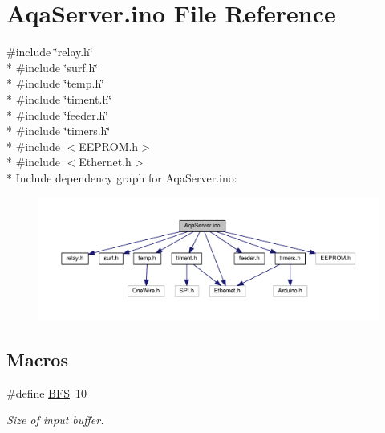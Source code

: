 \hypertarget{_aqa_server_8ino}{\section{Aqa\+Server.\+ino File Reference}
\label{_aqa_server_8ino}
}
{\ttfamily \#include \char`\"{}relay.\+h\char`\"{}}\\*
{\ttfamily \#include \char`\"{}surf.\+h\char`\"{}}\\*
{\ttfamily \#include \char`\"{}temp.\+h\char`\"{}}\\*
{\ttfamily \#include \char`\"{}timent.\+h\char`\"{}}\\*
{\ttfamily \#include \char`\"{}feeder.\+h\char`\"{}}\\*
{\ttfamily \#include \char`\"{}timers.\+h\char`\"{}}\\*
{\ttfamily \#include $<$E\+E\+P\+R\+O\+M.\+h$>$}\\*
{\ttfamily \#include $<$Ethernet.\+h$>$}\\*
Include dependency graph for Aqa\+Server.\+ino\+:
\nopagebreak
\begin{figure}[H]
\begin{center}
\leavevmode
\includegraphics[width=350pt]{_aqa_server_8ino__incl}
\end{center}
\end{figure}
\subsection*{Macros}
\begin{DoxyCompactItemize}
\item 
\#define \hyperlink{_aqa_server_8ino_a1b83ef6dcb797171631472c31018beef}{B\+F\+S}~10
\begin{DoxyCompactList}\small\item\em Size of input buffer. \end{DoxyCompactList}\end{DoxyCompactItemize}
